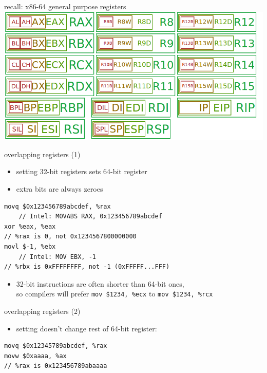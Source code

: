 \usetikzlibrary{calc}

\begin{frame}{recall: x86-64 general purpose registers}
\includegraphics[width=\textwidth]{../asm/x86-gprs}
\end{frame}

\begin{frame}[fragile,label=overlap]{overlapping registers (1)}
\begin{itemize}
\item setting 32-bit registers sets  64-bit register
\item extra bits are always zeroes
\end{itemize}
\begin{lstlisting}[style=small]
movq $0x123456789abcdef, %rax
    // Intel: MOVABS RAX, 0x123456789abcdef
xor %eax, %eax
// %rax is 0, not 0x1234567800000000
movl $-1, %ebx
    // Intel: MOV EBX, -1
// %rbx is 0xFFFFFFFF, not -1 (0xFFFFF...FFF)
\end{lstlisting}
\begin{itemize}
\item 32-bit instructions are often shorter than 64-bit ones, \\
so compilers will prefer \texttt{mov \$1234, \%ecx} to \texttt{mov \$1234, \%rcx}
\end{itemize}
\end{frame}

\begin{frame}[fragile,label=overlap2]{overlapping registers (2)}
\begin{itemize}
\item setting  doesn't change rest of 64-bit register:
\end{itemize}
\begin{lstlisting}[style=small]
movq $0x12345789abcdef, %rax
movw $0xaaaa, %ax
// %rax is 0x123456789abaaaa
\end{lstlisting}
\end{frame}


